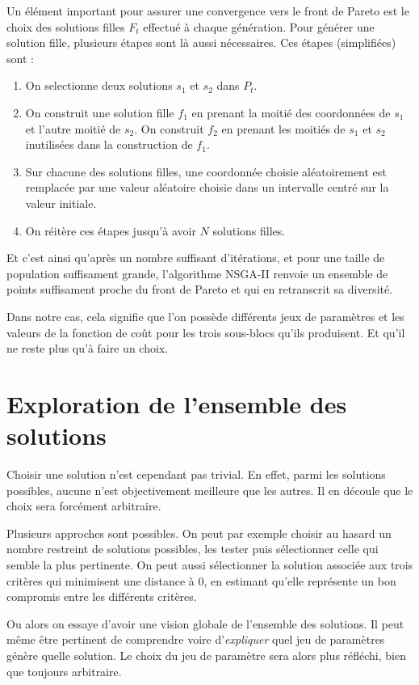 Un élément important pour assurer une convergence vers le front de Pareto est le choix des solutions filles $F_t$ effectué à chaque génération.
Pour générer une solution fille, plusieurs étapes sont là aussi nécessaires.
Ces étapes (simplifiées) sont :
\begin{enumerate}
 \item On selectionne deux solutions $s_1$ et $s_2$ dans $P_t$.
 \item On construit une solution fille $f_1$ en prenant la moitié des coordonnées de $s_1$ et l'autre moitié de $s_2$. 
 On construit $f_2$ en prenant les moitiés de $s_1$ et $s_2$ inutilisées dans la construction de $f_1$.
 \item Sur chacune des solutions filles, une coordonnée choisie aléatoirement est remplacée par une valeur aléatoire choisie dans un intervalle centré sur la valeur initiale.
 \item On réitère ces étapes jusqu'à avoir $N$ solutions filles.
\end{enumerate}


Et c'est ainsi qu'après un nombre suffisant d'itérations, et pour une taille de population suffisament grande, l'algorithme NSGA-II renvoie un ensemble de points suffisament proche du front de Pareto et qui en retranscrit sa diversité.


Dans notre cas, cela signifie que l'on possède différents jeux de paramètres et les valeurs de la fonction de coût pour les trois sous-blocs qu'ils produisent.
Et qu'il ne reste plus qu'à faire un choix.



\section{Exploration de l'ensemble des solutions}


Choisir une solution n'est cependant pas trivial.
En effet, parmi les solutions possibles, aucune n'est objectivement meilleure que les autres.
Il en découle que le choix sera forcément arbitraire.

Plusieurs approches sont possibles.
On peut par exemple choisir au hasard un nombre restreint de solutions possibles, les tester puis sélectionner celle qui semble la plus pertinente.
On peut aussi sélectionner la solution associée aux trois critères qui minimisent une distance à 0, en estimant qu'elle représente un bon compromis entre les différents critères.

Ou alors on essaye d'avoir une vision globale de l'ensemble des solutions.
Il peut même être pertinent de comprendre voire d'\emph{expliquer} quel jeu de paramètres génère quelle solution.
Le choix du jeu de paramètre sera alors plus réfléchi, bien que toujours arbitraire.


